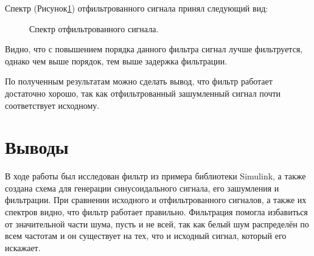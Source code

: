 \documentclass[a4paper,14pt]{extarticle}
\begin{document}
Спектр (Рисунок\ref{011}) отфильтрованного сигнала принял следующий вид:

\begin{figure}[H]
\caption{Спектр отфильтрованного сигнала.}
\label{011}
\end{figure}

Видно, что с повышением порядка данного фильтра сигнал лучше фильтруется, однако чем выше порядок, тем выше задержка фильтрации.

По полученным результатам можно сделать вывод, что фильтр работает достаточно хорошо, так как отфильтрованный зашумленный сигнал почти соответствует исходному.


\section{Выводы}

В ходе работы был исследован фильтр из примера библиотеки Simulink, а также создана схема для генерации синусоидального сигнала, его зашумления и фильтрации.
При сравнении исходного и отфильтрованного сигналов, а также их спектров видно, что фильтр работает правильно. Фильтрация помогла избавиться от значительной части шума, пусть и не всей, так как белый шум распределён по всем частотам и он существует на тех, что и исходный сигнал, который его искажает.
\end{document}
